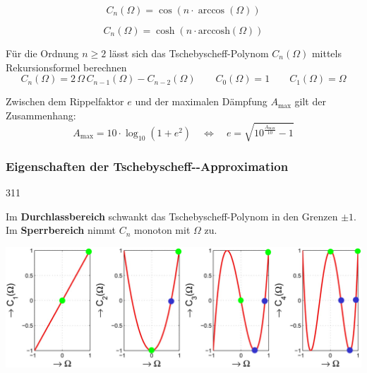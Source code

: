 \vspace{0.2cm}

\begin{minipage}[c]{0.48\columnwidth}
    \begin{center}
        $$ \boxed{ C_n(\Omega) = \cos(n \cdot \arccos(\Omega)) } $$
    \end{center}
    
\end{minipage}
\hfill
\begin{minipage}[c]{0.48\columnwidth}
    \begin{center}
        $$ \boxed{ C_n(\Omega) = \cosh(n \cdot \mathrm{arccosh}(\Omega)) } $$
    \end{center}
\end{minipage}

\vspace{0.2cm}
Für die Ordnung $n \geq 2$ lässt sich das Tschebyscheff-Polynom $C_n(\Omega)$ mittels Rekursionsformel berechnen
$$ \boxed{ C_n(\Omega) = 2 \, \Omega \, C_{n-1}(\Omega) - C_{n-2}(\Omega) }  \qquad C_0(\Omega) = 1 \qquad C_1(\Omega) = \Omega $$

Zwischen dem Rippelfaktor $e$ und der maximalen Dämpfung $A_{\max}$ gilt der Zusammenhang:
$$ \boxed{ A_{\max} = 10 \cdot \log_{10}(1 + e^2) \quad \Leftrightarrow \quad e = \sqrt{10^{\frac{A_{\max}}{10}} -1} } $$


\subsubsection{Eigenschaften der Tschebyscheff--Approximation}{311}

Im \textbf{Durchlassbereich} schwankt das Tschebyscheff-Polynom in den Grenzen $\pm 1$. Im \textbf{Sperrbereich} nimmt
$C_n$ monoton mit $\Omega$ zu.

\begin{center}
    \includegraphics[width=0.8\columnwidth]{images/filter_tschebyscheff_ordnung_ablesen.png}
\end{center}


